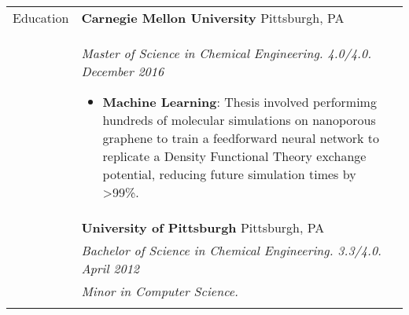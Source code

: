 \documentclass[11pt]{article}
\begin{document}
\begin{tabular}[t]{@{}p{1.00in}@{} @{}p{6.00in}@{}}

{Education}
&
\textbf{Carnegie Mellon University} \hfill Pittsburgh, PA \\ &
\textit{Master of Science in Chemical Engineering. 4.0/4.0. \hfill December 2016}
\begin{itemize}
    \item \textbf{Machine Learning}: Thesis involved performimg hundreds of molecular simulations on nanoporous graphene to train a feedforward neural network to replicate a Density Functional Theory exchange potential, reducing future simulation times by >99\%.
\end{itemize}
\\
&
\textbf{University of Pittsburgh} \hfill Pittsburgh, PA \\ &
\textit{Bachelor of Science in Chemical Engineering. 3.3/4.0. \hfill April 2012}
\\ &\textit{Minor in Computer Science.}%
\\
\\


\end{tabular}
\end{document}
